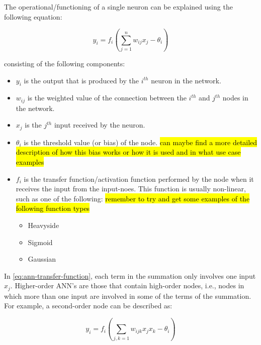 
The operational/functioning of a single neuron can be explained using the following equation:

\begin{equation} \label{eq:ann-transfer-function}
	y_i = f_i(\sum_{j=1}^{n} w_{ij} x_j - \theta_i)
\end{equation}

consisting of the following components:
\begin{itemize}
	\item $y_i$ is the output that is produced by the $i^{th}$ neuron in the network.
	\item $w_{ij}$ is the weighted value of the connection between the $i^{th}$ and $j^{th}$ nodes in the network.
	\item $x_j$ is the $j^{th}$ input received by the neuron.
	\item $\theta_i$ is the threshold value (or bias) of the node. \hl{can maybe find a more detailed description of how this bias works or how it is used and in what use case examples}
	\item $f_i$ is the transfer function/activation function performed by the node when it receives the input from the input-noes. This function is usually non-linear, such as one of the following: \hl{remember to try and get some examples of the following function types}
		\begin{itemize}
			\item Heavyside
			\item Sigmoid
			\item Gaussian
		\end{itemize}
\end{itemize}

In \ref{eq:ann-transfer-function}, each term in the summation only involves one input $x_j$. Higher-order ANN's are those that contain high-order nodes, i.e., nodes in which more than one input are involved in some of the terms of the summation. For example, a second-order node can be described as:

\begin{equation} \label{eq:higher-order-node}
	y_i = f_i (\sum_{{j,k}=1} w_{ijk}x_jx_k - \theta_i)
\end{equation}

